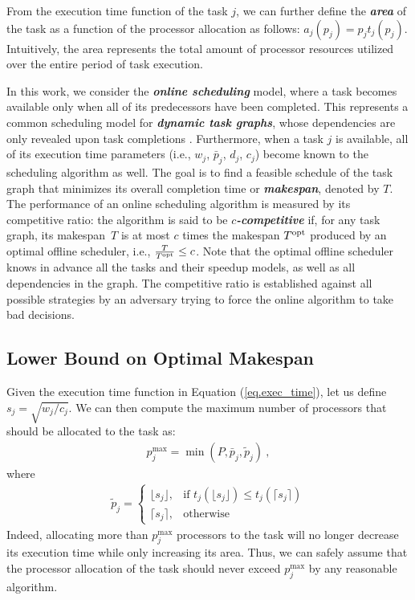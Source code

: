 \documentclass{article}
\newcommand\opt{\textnormal{opt}\xspace}
\begin{document}
From the execution time function of the task $j$, we can further define the \textbf{\emph{area}} of the task as a function
of the processor allocation as follows: $a_j(p_j) = p_j t_j(p_j)$. Intuitively, the area represents
the total amount of processor resources utilized over the entire period of task execution.

In this work, we consider the \textbf{\emph{online scheduling}} model, where a task becomes available
only when all of its predecessors have been completed. This represents a common scheduling model
for \textbf{\emph{dynamic task graphs}}, whose dependencies are only revealed upon task completions \cite{JOHNSON96_dynamic,Feldmann98_DAG,Agrawal10_dynamic,Canon20_online}.  Furthermore, when a task $j$ is available,
all of its execution time parameters (i.e., $w_j$, $\bar{p}_j$, $d_j$, $c_j$) become known
to the scheduling algorithm as well. The goal is to find a feasible schedule of the task graph that minimizes its overall completion time or \textbf{\emph{makespan}}, denoted by $T$. The performance of an online scheduling algorithm is measured by its competitive ratio: the algorithm is said to be \textbf{\emph{$c$-competitive}} if, for any task graph, its makespan~$T$ is at most $c$ times the makespan $T^{\opt}$ produced by an optimal offline scheduler, i.e., $\frac{T}{T^{\opt}} \le c$. Note that the optimal offline scheduler knows in advance all the tasks and their speedup models, as well as all dependencies in the graph. The competitive ratio is established against all possible strategies by an adversary trying to force the online algorithm to take bad decisions.

\subsection{Lower Bound on Optimal Makespan}

Given the execution time function in Equation (\ref{eq.exec_time}), let us define $s_j = \sqrt{w_j/c_j}$. We can then compute the maximum number of processors that should be allocated to the task as:
\begin{align}\label{eq.pjmax}
p_j^{\max} = \min\left(P, \bar{p}_j, \tilde{p}_j\right) \ ,
\end{align}
where\\[-.6cm]
\begin{align*}
\tilde{p}_j = \left\{\begin{array}{ll}
\lfloor s_j \rfloor, & \text{if } t_j(\lfloor s_j \rfloor) \le t_j(\lceil s_j \rceil)  \\
\lceil s_j \rceil, & \text{otherwise}
\end{array}\right .
\end{align*}
Indeed, allocating more than $p_j^{\max}$ processors to the task will no longer decrease its execution time while only increasing its area. Thus, we can safely assume that the processor allocation of the task should never exceed $p_j^{\max}$ by any reasonable algorithm.
\end{document}
